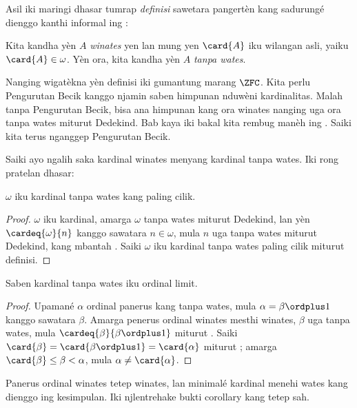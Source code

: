 \documentclass[../../../include/open-logic-section]{subfiles}
\begin{document}
Asil iki maringi dhasar tumrap \emph{definisi} sawetara
pangertèn kang sadurungé dienggo kanthi informal ing
:

\begin{defn}
Kita kandha yèn $A$ \emph{winates} yen lan mung yen $\card{A}$
iku wilangan asli, yaiku $\card{A} \in \omega$. Yèn ora,
kita kandha yèn $A$ \emph{tanpa wates}.
\end{defn}
\noindent
Nanging wigatèkna yèn definisi iki gumantung marang
$\ZFC$. Kita perlu Pengurutan Becik kanggo njamin
saben himpunan nduwèni kardinalitas. Malah tanpa
Pengurutan Becik, bisa ana himpunan kang ora winates
nanging uga ora tanpa wates miturut Dedekind. Bab kaya iki
bakal kita rembug manèh ing .
Saiki kita terus nganggep Pengurutan Becik.

Saiki ayo ngalih saka kardinal winates menyang kardinal
tanpa wates. Iki rong pratelan dhasar:

\begin{cor}
$\omega$ iku kardinal tanpa wates kang paling cilik.
\end{cor}

\begin{proof}
$\omega$ iku kardinal, amarga $\omega$ tanpa wates
miturut Dedekind, lan yèn $\cardeq{\omega}{n}$
kanggo sawatara $n \in \omega$, mula $n$ uga tanpa wates
miturut Dedekind, kang mbantah
. Saiki
$\omega$ iku kardinal tanpa wates paling cilik miturut definisi.
\end{proof}

\begin{cor}
Saben kardinal tanpa wates iku ordinal limit.
\end{cor}

\begin{proof}
Upamané $\alpha$ ordinal panerus kang tanpa wates, mula
$\alpha = \beta
\ordplus 1$ kanggo sawatara $\beta$. Amarga penerus ordinal
winates mesthi winates, $\beta$
uga tanpa wates, mula $\cardeq{\beta}{\beta \ordplus 1}$ miturut
. Saiki
$\card{\beta} = \card{\beta\ordplus 1} = \card{\alpha}$ miturut
; amarga
$\card{\beta} \leq \beta < \alpha$, mula
$\alpha \neq \card{\alpha}$.
\end{proof}
Panerus ordinal winates tetep winates, lan minimalé kardinal menehi wates kang dienggo ing kesimpulan. Iki njlentrehake bukti corollary kang tetep sah.
\end{document}
